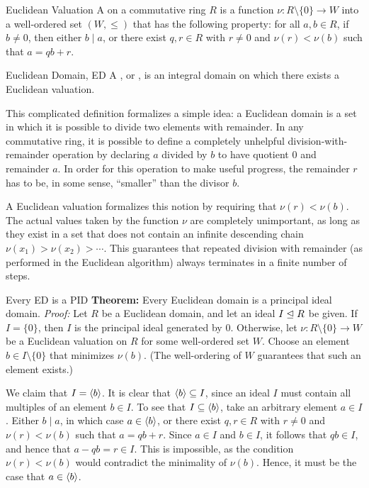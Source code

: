 \documentclass[12pt]{report}
\begin{document}
\begin{dfnbox}{Euclidean Valuation}
	A  on a commutative ring $R$ is a function $\nu: R \setminus \{0\} \to W$ into a well-ordered set $(W, \le)$ that has the following property: for all $a, b \in R$, if $b \ne 0$, then either $b \mid a$, or there exist $q, r \in R$ with $r \ne 0$ and $\nu(r) < \nu(b)$ such that $a = qb + r$.
\end{dfnbox}

\begin{dfnbox}{Euclidean Domain, ED}
	A , or , is an integral domain on which there exists a Euclidean valuation.
\end{dfnbox}

This complicated definition formalizes a simple idea: a Euclidean domain is a set in which it is possible to divide two elements with remainder. In any commutative ring, it is possible to define a completely unhelpful division-with-remainder operation by declaring $a$ divided by $b$ to have quotient $0$ and remainder $a$. In order for this operation to make useful progress, the remainder $r$ has to be, in some sense, ``smaller'' than the divisor $b$.

A Euclidean valuation formalizes this notion by requiring that $\nu(r) < \nu(b)$. The actual values taken by the function $\nu$ are completely unimportant, as long as they exist in a set that does not contain an infinite descending chain $\nu(x_1) > \nu(x_2) > \cdots$. This guarantees that repeated division with remainder (as performed in the Euclidean algorithm) always terminates in a finite number of steps.

\begin{thmbox}{Every ED is a PID}
	\textbf{Theorem:} Every Euclidean domain is a principal ideal domain.
\tcblower
	\textit{Proof:} Let $R$ be a Euclidean domain, and let an ideal $I \trianglelefteq R$ be given. If $I = \{0\}$, then $I$ is the principal ideal generated by $0$. Otherwise, let $\nu: R \setminus \{0\} \to W$ be a Euclidean valuation on $R$ for some well-ordered set $W$. Choose an element $b \in I \setminus \{0\}$ that minimizes $\nu(b)$. (The well-ordering of $W$ guarantees that such an element exists.)

	We claim that $I = {\langle {b} \rangle}$. It is clear that ${\langle {b} \rangle} \subseteq I$, since an ideal $I$ must contain all multiples of an element $b \in I$. To see that $I \subseteq {\langle {b} \rangle}$, take an arbitrary element $a \in I$. Either $b \mid a$, in which case $a \in {\langle {b} \rangle}$, or there exist $q, r \in R$ with $r \ne 0$ and $\nu(r) < \nu(b)$ such that $a = qb + r$. Since $a \in I$ and $b \in I$, it follows that $qb \in I$, and hence that $a - qb = r \in I$. This is impossible, as the condition $\nu(r) < \nu(b)$ would contradict the minimality of $\nu(b)$. Hence, it must be the case that $a \in {\langle {b} \rangle}$.
\end{thmbox}
\end{document}
